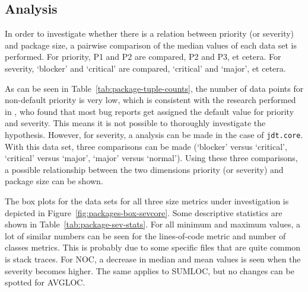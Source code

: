 \subsection{Analysis} %
In order to investigate whether there is a relation between priority (or severity) and package size, a pairwise comparison of the median values of each data set is performed. For priority, P1 and P2 are compared, P2 and P3, et cetera. For severity, `blocker' and `critical' are compared, `critical' and `major', et cetera.

As can be seen in Table~\ref{tab:package-tuple-counts}, the number of data points for non-default priority is very low, which is consistent with the research performed in \cite{Lamkanfi2010}, who found that most bug reports get assigned the default value for priority and severity. This means it is not possible to thoroughly investigate the hypothesis. However, for severity, a analysis can be made in the case of \texttt{jdt.core}. With this data set, three comparisons can be made (`blocker' versus `critical', `critical' versus `major', `major' versus `normal'). Using these three comparisons, a possible relationship between the two dimensions priority (or severity) and package size can be shown.

The box plots for the data sets for all three size metrics under investigation is depicted in Figure~\ref{fig:packages-box-sevcore}. Some descriptive statistics are shown in Table~\ref{tab:package-sev-stats}. For all minimum and maximum values, a lot of similar numbers can be seen for the lines-of-code metric and number of classes metrics. This is probably due to some specific files that are quite common is stack traces. For NOC, a decrease in median and mean values is seen when the severity becomes higher. The same applies to SUMLOC, but no changes can be spotted for AVGLOC.

